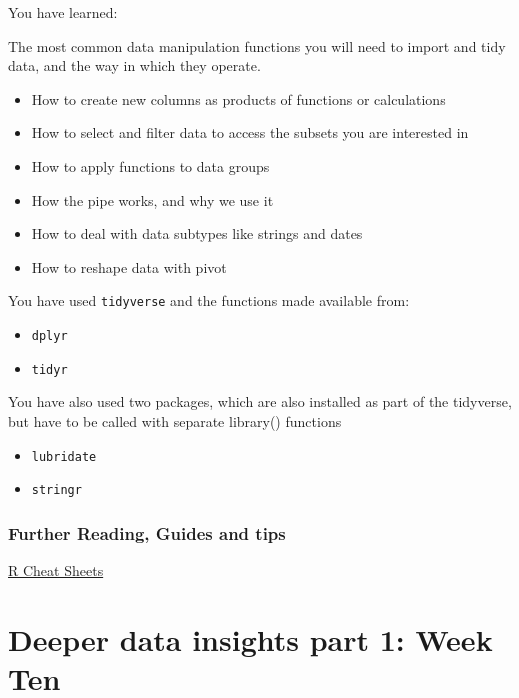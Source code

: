 \documentclass[
]{book}
\begin{document}
You have learned:

The most common data manipulation functions you will need to import and tidy data, and the way in which they operate.

\begin{itemize}
\item
  How to create new columns as products of functions or calculations
\item
  How to select and filter data to access the subsets you are interested in
\item
  How to apply functions to data groups
\item
  How the pipe works, and why we use it
\item
  How to deal with data subtypes like strings and dates
\item
  How to reshape data with pivot
\end{itemize}

You have used \texttt{tidyverse} and the functions made available from:

\begin{itemize}
\item
  \texttt{dplyr} \citet{R-dplyr}
\item
  \texttt{tidyr} \citet{R-tidyr}
\end{itemize}

You have also used two packages, which are also installed as part of the tidyverse, but have to be called with separate library() functions

\begin{itemize}
\item
  \texttt{lubridate} \citet{R-lubridate}
\item
  \texttt{stringr} \citet{R-stringr}
\end{itemize}

\hypertarget{further-reading-guides-and-tips-3}{%
\subsection{Further Reading, Guides and tips}\label{further-reading-guides-and-tips-3}}

\href{https://www.rstudio.com/resources/cheatsheets/}{R Cheat Sheets}

\hypertarget{deeper-data-insights-part-1-week-ten}{%
\chapter{Deeper data insights part 1: Week Ten}\label{deeper-data-insights-part-1-week-ten}}
\end{document}
